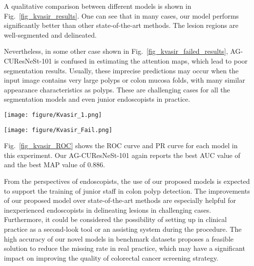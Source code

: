 \documentclass[review, sort&compress]{elsarticle}
\begin{document}
	
	A qualitative comparison between different models is shown in Fig.~\ref{fig_kvasir_results}. One can see that in many cases, our model performs significantly better than other state-of-the-art methods. The lesion regions are well-segmented and delineated. 
	
	Nevertheless, in some other case shown in Fig.~\ref{fig_kvasir_failed_results}, AG-CUResNeSt-101 is confused in estimating the attention maps, which lead to poor segmentation results. Usually, these imprecise predictions may occur when the input image contains very large polyps or colon mucosa folds, with many similar appearance characteristics as polyps. These are challenging cases for all the segmentation models and even junior endoscopists in practice. 


	\begin{figure*}[!ht]
		\centering
		\texttt{[image: figure/Kvasir\_1.png]}
		\caption{Qualitative result comparison of different models trained in Scenario 6, i.e., 5-fold cross-validation on the Kvasir-SEG dataset.}
		\label{fig_kvasir_results}
	\end{figure*}
	
	
	\begin{figure*}[!ht]
		\centering
		\texttt{[image: figure/Kvasir\_Fail.png]}
		\caption{Some failed cases of our model on the Kvasir-SEG dataset}
		\label{fig_kvasir_failed_results}
	\end{figure*}
	
	Fig.~\ref{fig_kvasir_ROC} shows the ROC curve and PR curve for each model in this experiment. Our AG-CUResNeSt-101 again reports the best AUC value of  and the best MAP value of 0.886. 
	
	From the perspectives of endoscopists, the use of our proposed models is expected to support the training of junior staff in colon polyp detection. The improvements of our proposed model over state-of-the-art methods are especially helpful for inexperienced endoscopists in delineating lesions in challenging cases. Furthermore, it could be considered the possibility of setting up in clinical practice as a second-look tool or an assisting system during the procedure. The high accuracy of our novel models in benchmark datasets proposes a feasible solution to reduce the missing rate in real practice, which may have a significant impact on improving the quality of colorectal cancer screening strategy.
	
\end{document}
